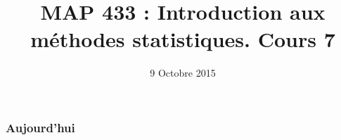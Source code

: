 



\title{MAP 433 : Introduction aux méthodes statistiques. Cours 7}

\date{9 Octobre 2015}
\maketitle



\begin{frame}
\frametitle{Aujourd'hui}
\tableofcontents
\end{frame}






%
%
%
%
